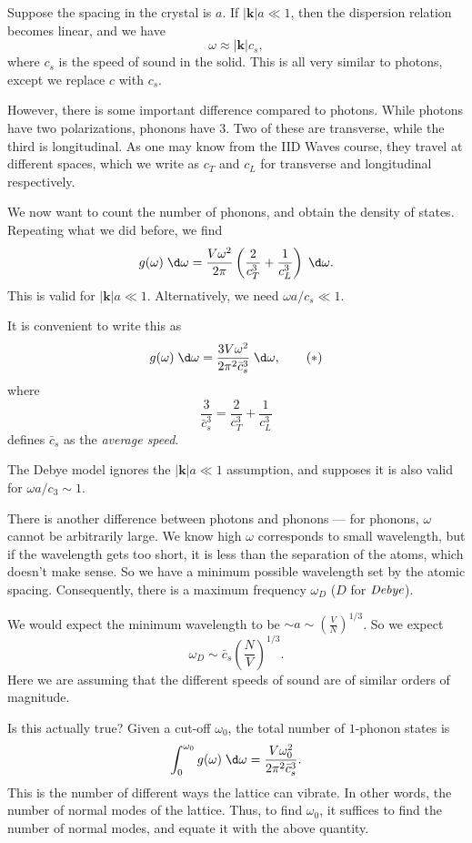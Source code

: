 \documentclass[a4paper]{article}
\begin{document}
Suppose the spacing in the crystal is $a$. If $|\mathbf{k}| a \ll 1$, then the dispersion relation becomes linear, and we have
\[
  \omega \approx |\mathbf{k}| c_s,
\]
where $c_s$ is the speed of sound in the solid. This is all very similar to photons, except we replace $c$ with $c_s$.

However, there is some important difference compared to photons. While photons have two polarizations, phonons have 3. Two of these are transverse, while the third is longitudinal. As one may know from the IID Waves course, they travel at different spaces, which we write as $c_T$ and $c_L$ for transverse and longitudinal respectively.

We now want to count the number of phonons, and obtain the density of states. Repeating what we did before, we find
\[
  g(\omega) \;\d \omega = \frac{V \omega^2}{2\pi} \left(\frac{2}{c_T^3} + \frac{1}{c_L^3}\right)\;\d \omega.
\]
This is valid for $|\mathbf{k}| a \ll 1$. Alternatively, we need $\omega a/ c_s \ll 1$.

It is convenient to write this as
\[
  g(\omega) \;\d \omega = \frac{3 V \omega^2}{2\pi^2 \bar{c}_s^3}\;\d \omega,\tag{$*$}
\]
where
\[
  \frac{3}{\bar{c}_s^3} = \frac{2}{c_T^3} + \frac{1}{c_L^3}
\]
defines $\bar{c}_s$ as the \emph{average speed}.

The Debye model ignores the $|\mathbf{k}|a \ll 1$ assumption, and supposes it is also valid for $\omega a/c_3 \sim 1$.

There is another difference between photons and phonons --- for phonons, $\omega$ cannot be arbitrarily large. We know high $\omega$ corresponds to small wavelength, but if the wavelength gets too short, it is less than the separation of the atoms, which doesn't make sense. So we have a minimum possible wavelength set by the atomic spacing. Consequently, there is a maximum frequency $\omega_D$ ($D$ for $\emph{Debye}$).

We would expect the minimum wavelength to be $\sim a \sim \left(\frac{V}{N}\right)^{1/3}$. So we expect
\[
  \omega_D \sim \bar{c}_s \left(\frac{N}{V}\right)^{1/3}.
\]
Here we are assuming that the different speeds of sound are of similar orders of magnitude.

Is this actually true? Given a cut-off $\omega_0$, the total number of $1$-phonon states is
\[
  \int_0^{\omega_0} g(\omega) \;\d \omega = \frac{V \omega_0^2}{2\pi^2 \bar{c}_s^3}.
\]
This is the number of different ways the lattice can vibrate. In other words, the number of normal modes of the lattice. Thus, to find $\omega_0$, it suffices to find the number of normal modes, and equate it with the above quantity.
\end{document}
